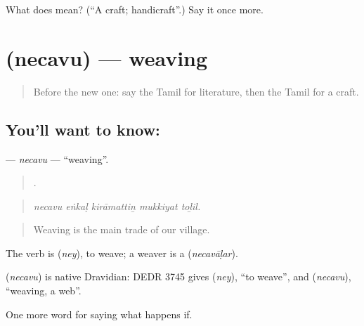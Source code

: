 \begin{tcolorbox}[breakable,colback=teal!4,colframe=teal!35!black,title={Before you move on}]
What does  mean? (\textquotedblleft{}A craft; handicraft\textquotedblright{}.) Say it once more.
\end{tcolorbox}
\section[\texorpdfstring{\ta{நெசவு} (necavu)}{நெசவு (necavu)}]{ (necavu) — weaving}

\label{lesson:TA-C556-necavu}



\begin{quote}
Before the new one: say the Tamil for literature, then the Tamil for a craft.
\end{quote}

\subsection*{You'll want to know: }
\textbf{} — \emph{necavu} — \textquotedblleft{}weaving\textquotedblright{}.

\begin{quote}
    .
\end{quote}

\begin{quote}
\emph{necavu eṅkaḷ kirāmattiṉ mukkiyat toḻil.}
\end{quote}

\begin{quote}
Weaving is the main trade of our village.
\end{quote}

The verb is  (\emph{ney}), to weave; a weaver is a  (\emph{necavāḷar}).

\begin{cousinweb}
\textbf{} (\emph{necavu}) is native Dravidian: DEDR 3745 gives  (\emph{ney}), \textquotedblleft{}to weave\textquotedblright{}, and  (\emph{necavu}), \textquotedblleft{}weaving, a web\textquotedblright{}.
\end{cousinweb}

\begin{grammarlens}[title={What you've built}]
One more word for saying what happens if.
\end{grammarlens}

